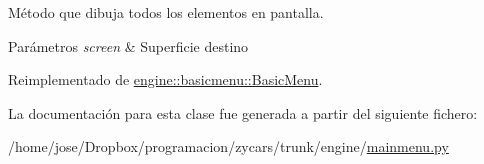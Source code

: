 \-Método que dibuja todos los elementos en pantalla. 


\begin{DoxyParams}{\-Parámetros}
{\em screen} & \-Superficie destino \\
\hline
\end{DoxyParams}


\-Reimplementado de \hyperlink{classengine_1_1basicmenu_1_1BasicMenu_a9aa29d8e353d2d3329597f5fbbf125b3}{engine\-::basicmenu\-::\-Basic\-Menu}.



\-La documentación para esta clase fue generada a partir del siguiente fichero\-:\begin{DoxyCompactItemize}
\item 
/home/jose/\-Dropbox/programacion/zycars/trunk/engine/\hyperlink{mainmenu_8py}{mainmenu.\-py}\end{DoxyCompactItemize}
